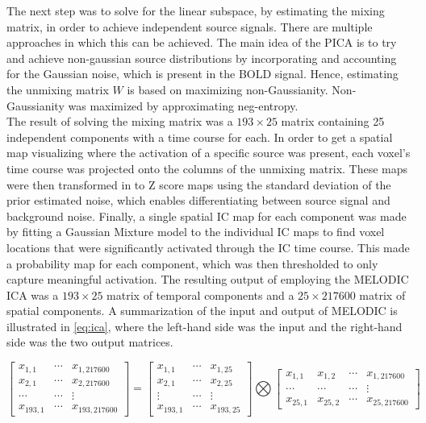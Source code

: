 The next step was to solve for the linear subspace, by estimating the mixing matrix, in order to achieve independent source signals. There are multiple approaches in which this can be achieved. The main idea of the PICA is to try and achieve non-gaussian source distributions by incorporating and accounting for the Gaussian noise, which is present in the BOLD signal. Hence, estimating the unmixing matrix $W$ is based on maximizing non-Gaussianity. Non-Gaussianity was maximized by approximating neg-entropy. \\
The result of solving the mixing matrix was a $193 \times 25$ matrix containing 25 independent components with a time course for each. In order to get a spatial map visualizing where the activation of a specific source was present, each voxel's time course was projected onto the columns of the unmixing matrix. These maps were then transformed in to Z score maps using the standard deviation of the prior estimated noise, which enables differentiating between source signal and background noise. Finally, a single spatial IC map for each component was made by fitting a Gaussian Mixture model to the individual IC maps to find voxel locations that were significantly activated through the IC time course. This made a probability map for each component, which was then thresholded to only capture meaningful activation. The resulting output of employing the MELODIC ICA was a $193 \times 25$ matrix of temporal components and a $25 \times 217600$ matrix of spatial components. A summarization of the input and output of MELODIC is illustrated in \eqref{eq:ica}, where the left-hand side was the input and the right-hand side was the two output matrices. 
 
\begin{equation} \label{eq:ica}
 \begin{bmatrix}
	x_{1,1}  & \cdots & x_{1,217600} \\
	x_{2,1}  & \cdots & x_{2,217600} \\
	\cdots   & \cdots & \vdots \\
	x_{193,1}& \cdots & x_{193,217600} 
\end{bmatrix}
= 
\begin{bmatrix}
	x_{1,1}  & \cdots & x_{1,25} \\
	x_{2,1}  & \cdots & x_{2,25} \\
	\vdots   & \cdots & \vdots \\
	x_{193,1} & \cdots & x_{193,25} 
\end{bmatrix}
\bigotimes 
\begin{bmatrix}
	x_{1,1} & x_{1,2} & \cdots & x_{1,217600} \\
	\cdots & \cdots & \cdots & \vdots \\
	x_{25,1} & x_{25,2} & \cdots & x_{25,217600} 
\end{bmatrix}
\end{equation}